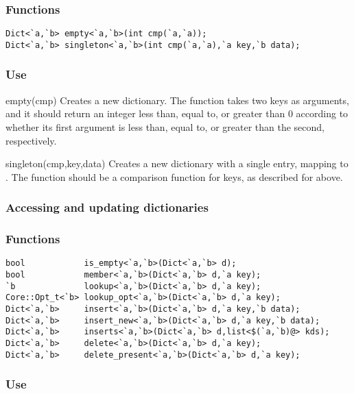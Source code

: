 \subsubsection*{Functions}
\begin{verbatim}
Dict<`a,`b> empty<`a,`b>(int cmp(`a,`a));
Dict<`a,`b> singleton<`a,`b>(int cmp(`a,`a),`a key,`b data);
\end{verbatim}

\subsubsection*{Use}
\begin{defun}{empty}{(cmp)}
Creates a new dictionary.  The function  takes two keys as
arguments, and it should return an integer less than, equal to, or
greater than 0 according to whether its first argument is less than,
equal to, or greater than the second, respectively.
\end{defun}

\begin{defun}{singleton}{(cmp,key,data)}
Creates a new dictionary with a single entry, mapping  to
.  The function  should be a comparison function for
keys, as described for  above.
\end{defun}

\subsubsection*{Accessing and updating dictionaries}

\subsubsection*{Functions}
\begin{verbatim}
bool            is_empty<`a,`b>(Dict<`a,`b> d);
bool            member<`a,`b>(Dict<`a,`b> d,`a key);
`b              lookup<`a,`b>(Dict<`a,`b> d,`a key);
Core::Opt_t<`b> lookup_opt<`a,`b>(Dict<`a,`b> d,`a key);
Dict<`a,`b>     insert<`a,`b>(Dict<`a,`b> d,`a key,`b data);
Dict<`a,`b>     insert_new<`a,`b>(Dict<`a,`b> d,`a key,`b data);
Dict<`a,`b>     inserts<`a,`b>(Dict<`a,`b> d,list<$(`a,`b)@> kds);
Dict<`a,`b>     delete<`a,`b>(Dict<`a,`b> d,`a key);
Dict<`a,`b>     delete_present<`a,`b>(Dict<`a,`b> d,`a key);
\end{verbatim}

\subsubsection*{Use}

